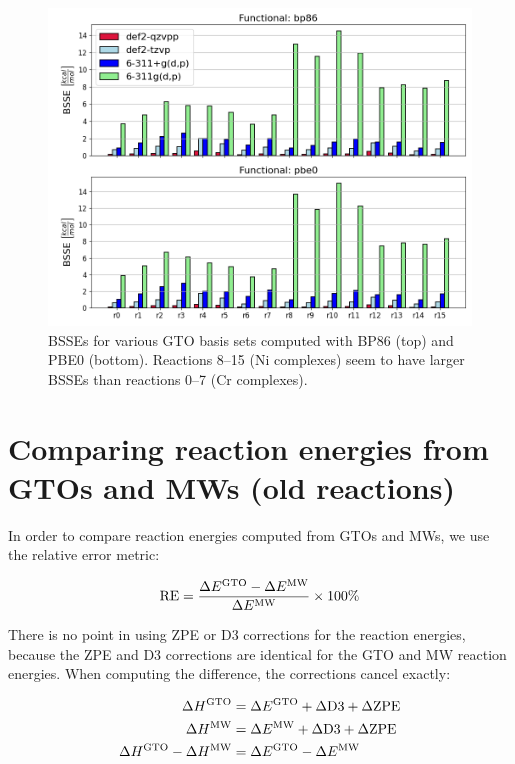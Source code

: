 \documentclass[11pt,a4paper]{article}
\begin{document}
\begin{figure}[H]
	\centering
	\includegraphics[width = \textwidth]{../figs/bsse.png}
	\caption{BSSEs for various GTO basis sets computed with BP86 (top) and PBE0 (bottom). Reactions 8--15 (Ni complexes) seem to have larger BSSEs than reactions 0--7 (Cr complexes).}
	\label{fig: bsse overview}
\end{figure}

\section{Comparing reaction energies from GTOs and MWs (old reactions)}
In order to compare reaction energies computed from GTOs and MWs, we use the relative error metric:

\begin{equation} \label{eq: relative error}
\text{RE} = \frac{\Delta E^{\small\text{GTO}} - \Delta E^{\small\text{MW}}}{\Delta E^{\small\text{MW}}} \times 100\%
\end{equation}

There is no point in using ZPE or D3 corrections for the reaction energies, because the ZPE and D3 corrections are identical for the GTO and MW reaction energies.
When computing the difference, the corrections cancel exactly:

\begin{align} \label{eq: }
 \Delta H^{\small\text{GTO}} &= \Delta E^{\small\text{GTO}} + \Delta \text{D3} + \Delta \text{ZPE} \\
  \Delta H^{\small\text{MW}} &= \Delta E^{\small\text{MW}} + \Delta \text{D3} + \Delta \text{ZPE} \\
  \Delta H^{\small\text{GTO}} - \Delta H^{\small\text{MW}} &= \Delta E^{\small\text{GTO}} - \Delta E^{\small\text{MW}}
\end{align}
\end{document}
